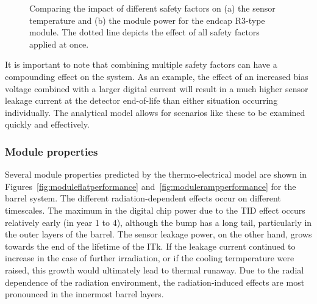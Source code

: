 \begin{figure}[ht]
\centering
{}\quad\quad
{}
\caption{Comparing the impact of different safety factors on (a) the sensor temperature and
(b) the module power for the endcap R3-type module. The dotted line depicts the effect of all safety
factors applied at once.}
\label{fig:safety_factors}
\end{figure}

It is important to note that combining multiple safety factors can have a compounding effect on the system. As an example, the effect of an increased bias voltage combined with a larger digital current will result in a much higher sensor leakage current at the detector end-of-life than either situation occurring individually. The analytical model allows for scenarios like these to be examined quickly and effectively.

\subsubsection{Module properties}

Several module properties predicted by the thermo-electrical model are shown in Figures~\ref{fig:moduleflatperformance} and~\ref{fig:modulerampperformance} for the barrel system. The different radiation-dependent effects occur on different timescales. The maximum in the digital chip power due to the TID effect occurs relatively early (in year 1 to 4), although the bump has a long tail, particularly in the outer layers of the barrel. The sensor leakage power, on the other hand, grows towards the end of the lifetime of the ITk. If the leakage current continued to increase in the case of further irradiation, or if the cooling termperature were raised, this growth would ultimately lead to thermal runaway. Due to the radial dependence of the radiation environment, the radiation-induced effects are most pronounced in the innermost barrel layers.

